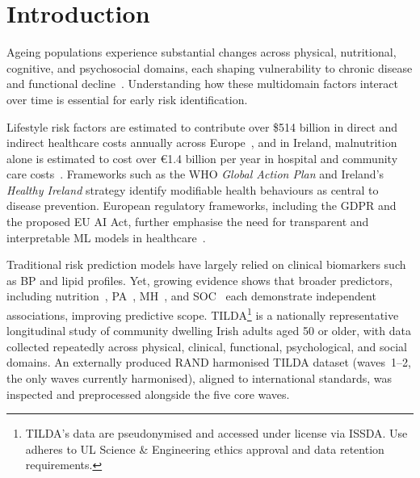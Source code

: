 
\chapter{Introduction}\label{ch:chapter1}


Ageing populations experience substantial changes across physical, nutritional, cognitive, and psychosocial domains, each shaping vulnerability to chronic disease and functional decline~\cite{davisComparisonGaitSpeed2021, moguilnerImportanceAgePrediction2021, huangSexDifferencesAssociations2020}. Understanding how these multidomain factors interact over time is essential for early risk identification.

Lifestyle risk factors are estimated to contribute over \$514 billion in direct and indirect healthcare costs annually across Europe~\cite{WhoNutritionReport}, and in Ireland, malnutrition alone is estimated to cost over \euro1.4 billion per year in hospital and community care costs~\cite{RICE2012}. Frameworks such as the \gls{WHO} \emph{Global Action Plan} and Ireland's \emph{Healthy Ireland} strategy identify modifiable health behaviours as central to disease prevention. European regulatory frameworks, including the \gls{GDPR} and the proposed \gls{EU} \gls{AI} Act, further emphasise the need for transparent and interpretable \gls{ML} models in healthcare~\cite{2021EUAIActBill}.

Traditional risk prediction models have largely relied on clinical biomarkers such as \gls{BP} and lipid profiles. Yet, growing evidence shows that broader predictors, including nutrition~\cite{murphyPlasmaLuteinZeaxanthin2023}, \gls{PA}~\cite{lairdPhysicalActivityDose2023}, \gls{MH}~\cite{mcdowellAssociationsPhysicalActivity2018}, and \gls{SOC}~\cite{mccrorySocialDisadvantageSocial2016} each demonstrate independent associations, improving predictive scope.
\clearpage
\gls{TILDA}\footnote{\gls{TILDA}'s data are pseudonymised and accessed under license via \gls{ISSDA}. Use adheres to \gls{UL} Science \& Engineering ethics approval and data retention requirements.} is a nationally representative longitudinal study of community dwelling Irish adults aged 50 or older, with data collected repeatedly across physical, clinical, functional, psychological, and social domains. An externally produced \gls{RAND} harmonised \gls{TILDA} dataset (waves~1--2, the only waves currently harmonised), aligned to international standards, was inspected and preprocessed alongside the five core waves.

